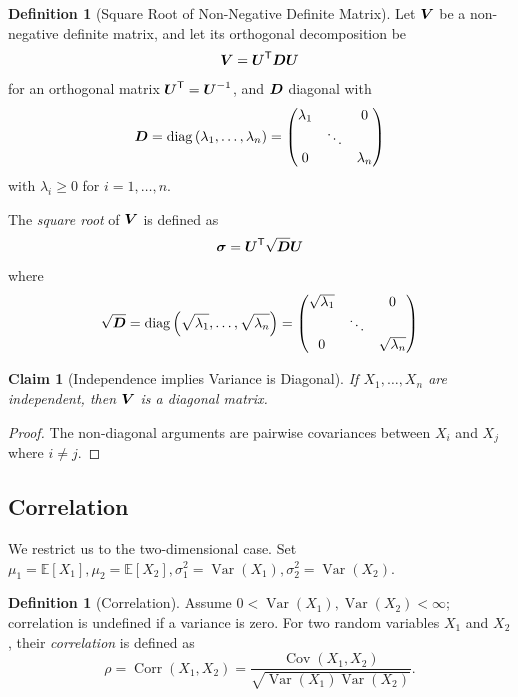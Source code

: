 \documentclass[11pt]{article}
\numberwithin{equation}{section}
\newtheorem{claim}[theorem]{Claim}
\theoremstyle{definition}
\newtheorem{definition}[theorem]{Definition}
\theoremstyle{remark}
\newcommand{\pqty}[1]{\left(#1\right)}
\newcommand{\bqty}[1]{\left[#1\right]}
\newcommand{\inverse}{^{-1}}
\newcommand{\transpose}{^{\mathsf T}}
\newcommand{\Expt}{\mathbb E}
\DeclareMathOperator{\Var}{Var}
\DeclareMathOperator{\Cov}{Cov}
\DeclareMathOperator{\Corr}{Corr}
\DeclareMathOperator{\diag}{diag}
\newcommand{\pmqty}[1]{\begin{pmatrix}#1\end{pmatrix}}
\begin{document}
\begin{definition}[Square Root of Non-Negative Definite Matrix]\label{probability-definition-060}
    \label{probability-def:sqrt-non-negative-definite-matrix}%
    Let \(\vb{V}\) be a non-negative definite matrix, and let its orthogonal decomposition be
    \[
        \vb{V} = \vb{U}\transpose \vb{D} \vb{U}
    \]
    for an orthogonal matrix \(\vb{U}\transpose = \vb{U}\inverse\), and \(\vb{D}\) diagonal with
    \[
        \vb{D} = \diag\pqty{\lambda_1, \ldots, \lambda_n} = \pmqty{\lambda_1& &0\\ &\ddots& \\0&&\lambda_n}
    \]
    with \(\lambda_i \geq 0\) for \(i = 1, \ldots, n\).

    The \emph{square root} of \(\vb{V}\) is defined as
    \[
        \vb*{\sigma} = \vb{U}\transpose \sqrt{\vb{D}} \vb{U}
    \]
    where
    \[
        \sqrt{\vb{D}} = \diag\pqty{\sqrt{\lambda_1}, \ldots, \sqrt{\lambda_n}} = \pmqty{\sqrt{\lambda_1}& &0\\ &\ddots& \\0&&\sqrt{\lambda_n}}
    \]
\end{definition}

\begin{claim}[Independence implies Variance is Diagonal]\label{probability-claim-002}
    \label{probability-claim:indep-diagonal-variance}%
    If \(X_1, \ldots, X_n\) are independent, then \(\vb{V}\) is a diagonal matrix.
\end{claim}

\begin{proof}\label{probability-proof-074}
    The non-diagonal arguments are pairwise covariances between \(X_i\) and \(X_j\) where \(i \neq j\).
\end{proof}

\subsection{Correlation}

We restrict us to the two-dimensional case. Set \(\mu_1 = \Expt\bqty{X_1}, \mu_2 = \Expt\bqty{X_2}, \sigma_1^2 = \Var\pqty{X_1}, \sigma_2^2 = \Var\pqty{X_2}\).

\begin{definition}[Correlation]\label{probability-definition-061}
   \label{probability-def:corr}%
Assume \(0<\Var(X_1),\Var(X_2)<\infty\); correlation is undefined if a variance is zero.
    For two random variables \(X_1\) and \(X_2\), their \emph{correlation} is defined as
    \[
        \rho = \Corr\pqty{X_1, X_2} = \frac{\Cov\pqty{X_1, X_2}}{\sqrt{\Var\pqty{X_1} \Var\pqty{X_2}}}.
    \]
\end{definition}
\end{document}
